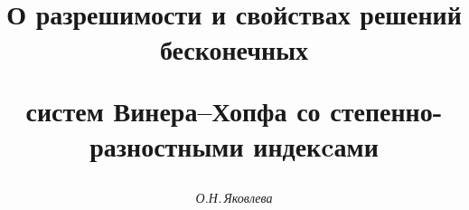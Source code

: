 









\newcommand{\ind}{\operatorname{ind}}


\newcommand{\tts}[1]{}










\setcounter{page}{66}















\author{\it О.Н.\,Яковлева}




\title{О разрешимости и свойствах решений бесконечных


систем Винера--Хопфа со степенно-разностными индекcами}





\date{}




\pagestyle{plain} %







\maketitle


\label{begin}








